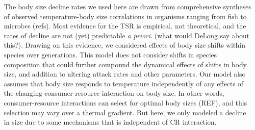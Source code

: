 \documentclass[11pt]{article}
\begin{document}
The body size decline rates we used here are drawn from comprehensive syntheses of observed temperature-body size correlations in organisms ranging from fish to microbes (refs). Most evidence for the TSR is empirical, not theoretical, and the rates of decline are not (yet) predictable \textit{a priori}. (what would DeLong say about this?). Drawing on this evidence, we considered effects of body size shifts within species over generations. This model does not consider shifts in species composition that could further compound the dynamical effects of shifts in body size, and addition to altering attack rates and other parameters. Our model also assumes that body size responds to temperature independently of any effects of the changing consumer-resource interaction on body size. In other words, consumer-resource interactions can select for optimal body sizes (REF), and this selection may vary over a thermal gradient. But here, we only modeled a decline in size due to some mechanisms that is independent of CR interaction.
%
%
%
%
\end{document}
